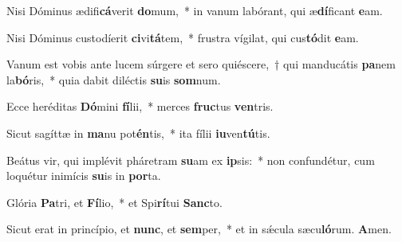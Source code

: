 \item Nisi Dóminus ædifi\textbf{cá}verit \textbf{do}mum,~* in vanum labórant, qui æ\textbf{dí}ficant \textbf{e}am.

\item Nisi Dóminus custodíerit \textbf{ci}vi\textbf{tá}tem,~* frustra vígilat, qui cus\textbf{tó}dit \textbf{e}am.

\item Vanum est vobis ante lucem súrgere et sero quiéscere,~† qui manducátis \textbf{pa}nem la\textbf{bó}ris,~* quia dabit diléctis \textbf{su}is \textbf{som}num.

\item Ecce heréditas \textbf{Dó}mini \textbf{fí}lii,~* merces \textbf{fruc}tus \textbf{ven}tris.

\item Sicut sagíttæ in \textbf{ma}nu pot\textbf{én}tis,~* ita fílii \textbf{iu}ven\textbf{tú}tis.

\item Beátus vir, qui implévit pháretram \textbf{su}am ex \textbf{ip}sis:~* non confundétur, cum loquétur inimícis \textbf{su}is in \textbf{por}ta.

\item Glória \textbf{Pa}tri, et \textbf{Fí}lio,~* et Spi\textbf{rí}tui \textbf{Sanc}to.

\item Sicut erat in princípio, et \textbf{nunc}, et \textbf{sem}per,~* et in sǽcula sæcu\textbf{ló}rum. \textbf{A}men.